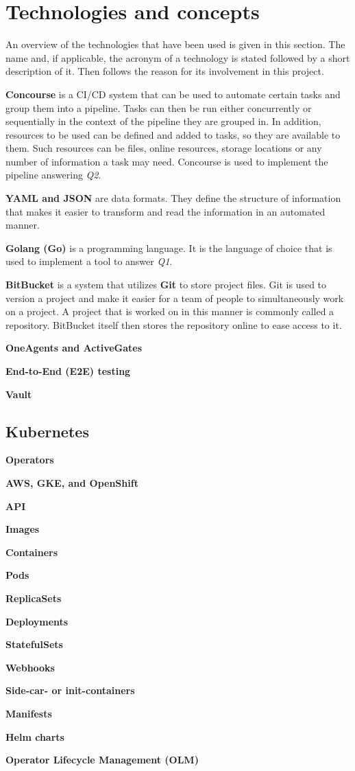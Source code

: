 \chapter{Technologies and concepts}\label{ch:technologies-used}

An overview of the technologies that have been used is given in this section.
The name and, if applicable, the acronym of a technology is stated followed by a short description of it.
Then follows the reason for its involvement in this project.

\textbf{Concourse} is a CI/CD system that can be used to automate certain tasks and group them into a pipeline.
Tasks can then be run either concurrently or sequentially in the context of the pipeline they are grouped in.
In addition, resources to be used can be defined and added to tasks, so they are available to them.
Such resources can be files, online resources, storage locations or any number of information a task may need.
Concourse is used to implement the pipeline answering \textit{Q2}.

\textbf{YAML and JSON} are data formats.
They define the structure of information that makes it easier to transform and read the information in an automated manner.

\textbf{Golang (Go)} is a programming language.
It is the language of choice that is used to implement a tool to answer \textit{Q1}.

\textbf{BitBucket} is a system that utilizes \textbf{Git} to store project files.
Git is used to version a project and make it easier for a team of people to simultaneously work on a project.
A project that is worked on in this manner is commonly called a repository.
BitBucket itself then stores the repository online to ease access to it.

\textbf{OneAgents and ActiveGates}

\textbf{End-to-End (E2E) testing}

\textbf{Vault}

\section{Kubernetes}\label{sec:kubernetes}

\textbf{Operators}

\textbf{AWS, GKE, and OpenShift}

\textbf{API}

\textbf{Images}

\textbf{Containers}

\textbf{Pods}

\textbf{ReplicaSets}

\textbf{Deployments}

\textbf{StatefulSets}

\textbf{Webhooks}

\textbf{Side-car- or init-containers}

\textbf{Manifests}

\textbf{Helm charts}

\textbf{Operator Lifecycle Management (OLM)}